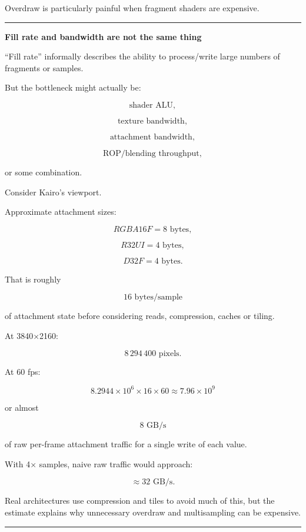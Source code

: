 Overdraw is particularly painful when fragment shaders are expensive.

\begin{center}\rule{0.5\linewidth}{0.5pt}\end{center}

\textbf{Fill rate and bandwidth are not the same thing}

``Fill rate'' informally describes the ability to process/write large numbers of fragments or samples.

But the bottleneck might actually be:

\[
\text{shader ALU},
\]

\[
\text{texture bandwidth},
\]

\[
\text{attachment bandwidth},
\]

\[
\text{ROP/blending throughput},
\]

or some combination.

Consider Kairo's viewport.

Approximate attachment sizes:

\[
RGBA16F = 8\text{ bytes},
\]

\[
R32UI = 4\text{ bytes},
\]

\[
D32F = 4\text{ bytes}.
\]

That is roughly

\[
16\text{ bytes/sample}
\]

of attachment state before considering reads, compression, caches or tiling.

At 3840×2160:

\[
8\,294\,400\text{ pixels}.
\]

At 60 fps:

\[
8.2944\times10^6
\times16
\times60
\approx7.96\times10^9
\]

or almost

\[
\boxed{8\text{ GB/s}}
\]

of raw per-frame attachment traffic for a single write of each value.

With 4× samples, naive raw traffic would approach:

\[
\approx32\text{ GB/s}.
\]

Real architectures use compression and tiles to avoid much of this, but the estimate explains why unnecessary overdraw and multisampling can be expensive.

\begin{center}\rule{0.5\linewidth}{0.5pt}\end{center}

